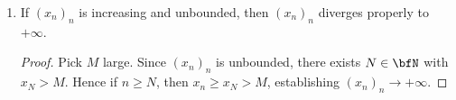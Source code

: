 \begin{enumerate}[label = (\arabic*)]
{\begin{proof}
\begin{center}
                    \end{center}
                But for $n \geq N$:
                    \begin{equation*}
                    \begin{split}
                        u-\epsilon < x_N \leq x_n \leq u < u + \epsilon.
                    \end{split}
                    \end{equation*}
                Hence $|x_n-u| < \epsilon$, establishing that $(x_n)_n \rightarrow u$. Now let $y_n = -x_n$. Then $y_n$ is increasing and bounded above. We get:
                    \begin{equation*}
                    \begin{split}
                        \lim y_n = \sup\{y_n \mid n \in \bfN\}
                        & \implies -\lim x_n = \sup\{-x_n \mid n \in \bfN\} \\
                        & \implies -\lim x_n = -\inf\{x_n \mid n \in \bfN\} \\
                        & \implies \phantom{-}\lim x_n = \inf\{x_n \mid n \in \bfN\}. \qedhere
                    \end{split}
                    \end{equation*}
            \end{proof}}

        \item If $(x_n)_n$ is increasing and unbounded, then $(x_n)_n$ diverges properly to $+\infty$.
            {\color{red} \begin{proof}
                Pick $M$ large. Since $(x_n)_n$ is unbounded, there exists $N \in \bfN$ with $x_N > M$. Hence if $n \geq N$, then $x_n \geq x_N > M$, establishing $(x_n)_n \rightarrow +\infty$.
            \end{proof}}
   \end{enumerate}

